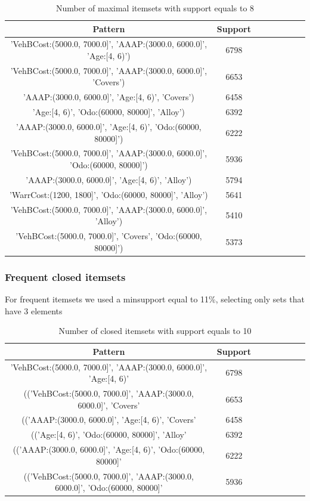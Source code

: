 \documentclass{article}
\begin{document}
	\begin{table}[H]
		\centering
		\begin{tabular}{c|ccccccc}
			\hline
			Pattern & Support \\
			\hline
			\rowcolor{Gray}
			'VehBCost:(5000.0, 7000.0]', 'AAAP:(3000.0, 6000.0]', 'Age:[4, 6)') &  6798\\
			'VehBCost:(5000.0, 7000.0]', 'AAAP:(3000.0, 6000.0]', 'Covers') &  6653\\
			\rowcolor{Gray}
			'AAAP:(3000.0, 6000.0]', 'Age:[4, 6)', 'Covers') &  6458\\
			'Age:[4, 6)', 'Odo:(60000, 80000]', 'Alloy') &  6392\\
			\rowcolor{Gray}
			'AAAP:(3000.0, 6000.0]', 'Age:[4, 6)', 'Odo:(60000, 80000]') &  6222\\
			'VehBCost:(5000.0, 7000.0]', 'AAAP:(3000.0, 6000.0]', 'Odo:(60000, 80000]')  & 5936\\
			\rowcolor{Gray}
			'AAAP:(3000.0, 6000.0]', 'Age:[4, 6)', 'Alloy') &  5794\\
			'WarrCost:(1200, 1800]', 'Odo:(60000, 80000]', 'Alloy') & 5641\\
			\rowcolor{Gray}
			'VehBCost:(5000.0, 7000.0]', 'AAAP:(3000.0, 6000.0]', 'Alloy') &  5410\\
			'VehBCost:(5000.0, 7000.0]', 'Covers', 'Odo:(60000, 80000]') & 5373\\
		\end{tabular}
		\caption{Number of maximal itemsets with support equals to 8}
	\end{table}
	
	\subsubsection{Frequent closed itemsets}
	For frequent itemsets we used a minsupport equal to 11\%, selecting only sets that have 3 elements
	
	\begin{table}[H]
		\centering
		\begin{tabular}{c|ccccccc}
			\hline
			Pattern & Support \\
			\hline
			\rowcolor{Gray}
			'VehBCost:(5000.0, 7000.0]', 'AAAP:(3000.0, 6000.0]', 'Age:[4, 6)' & 6798\\
			(('VehBCost:(5000.0, 7000.0]', 'AAAP:(3000.0, 6000.0]', 'Covers' & 6653\\
			\rowcolor{Gray}
			(('AAAP:(3000.0, 6000.0]', 'Age:[4, 6)', 'Covers' &  6458\\
			(('Age:[4, 6)', 'Odo:(60000, 80000]', 'Alloy' &  6392\\
			\rowcolor{Gray}
			(('AAAP:(3000.0, 6000.0]', 'Age:[4, 6)', 'Odo:(60000, 80000]' &  6222\\
			(('VehBCost:(5000.0, 7000.0]', 'AAAP:(3000.0, 6000.0]', 'Odo:(60000, 80000]' & 5936\\
		\end{tabular}
		\caption{Number of closed itemsets with support equals to 10}
	\end{table}
	
\end{document}
